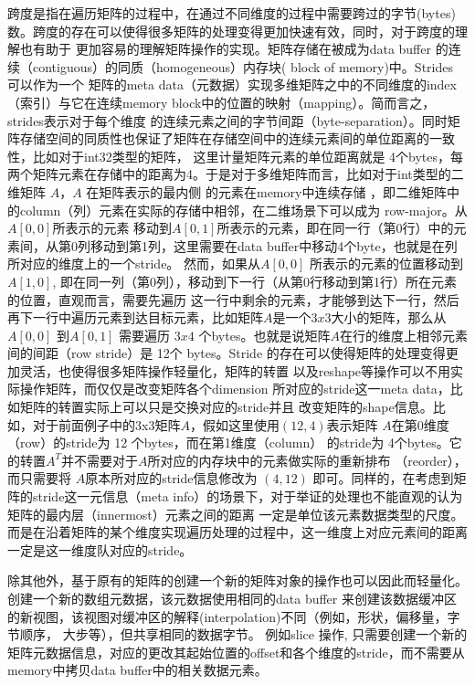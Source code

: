 跨度是指在遍历矩阵的过程中，在通过不同维度的过程中需要跨过的字节(bytes)数。跨度的存在可以使得很多矩阵的处理变得更加快速有效，同时，对于跨度的理解也有助于
更加容易的理解矩阵操作的实现。矩阵存储在被成为data buffer 的连续（contiguous）的同质（homogeneous）内存块( block of memory)中。Strides 可以作为一个
矩阵的meta data（元数据）实现多维矩阵之中的不同维度的index（索引）与它在连续memory block中的位置的映射（mapping）。简而言之，strides表示对于每个维度
的连续元素之间的字节间距（byte-separation）。同时矩阵存储空间的同质性也保证了矩阵在存储空间中的连续元素间的单位距离的一致性，比如对于int32类型的矩阵，
这里计量矩阵元素的单位距离就是 4个bytes，每两个矩阵元素在存储中的距离为4。于是对于多维矩阵而言，比如对于int类型的二维矩阵 $A$，$A$ 在矩阵表示的最内侧
的元素在memory中连续存储 ，即二维矩阵中的column（列）元素在实际的存储中相邻，在二维场景下可以成为 row-major。从$A[0, 0]$所表示的元素
移动到$A[0,1]$所表示的元素，即在同一行（第0行）中的元素间，从第0列移动到第1列，这里需要在data buffer中移动4个byte，也就是在列所对应的维度上的一个stride。
然而，如果从$A[0,0]$ 所表示的元素的位置移动到 $A[1, 0]$, 即在同一列（第0列），移动到下一行（从第0行移动到第1行）所在元素的位置，直观而言，需要先遍历
这一行中剩余的元素，才能够到达下一行，然后再下一行中遍历元素到达目标元素，比如矩阵$A$是一个$3x3$大小的矩阵，那么从 $A[0,0]$ 到$A[0,1]$ 需要遍历
$3x4$ 个bytes。也就是说矩阵$A$在行的维度上相邻元素间的间距（row stride）是 12个 bytes。Stride 的存在可以使得矩阵的处理变得更加灵活，也使得很多矩阵操作轻量化，矩阵的转置
以及reshape等操作可以不用实际操作矩阵，而仅仅是改变矩阵各个dimension 所对应的stride这一meta data，比如矩阵的转置实际上可以只是交换对应的stride并且
改变矩阵的shape信息。比如，对于前面例子中的3x3矩阵$A$，假如这里使用$(12, 4)$表示矩阵 $A$在第0维度（row）的stride为 12 个bytes，而在第1维度（column）
的stride为 4个bytes。它的转置$A^T$并不需要对于$A$所对应的内存块中的元素做实际的重新排布 （reorder），而只需要将 $A$原本所对应的stride信息修改为
$(4, 12)$ 即可。同样的，在考虑到矩阵的stride这一元信息（meta info）的场景下，对于举证的处理也不能直观的认为矩阵的最内层（innermost）元素之间的距离
一定是单位该元素数据类型的尺度。而是在沿着矩阵的某个维度实现遍历处理的过程中，这一维度上对应元素间的距离一定是这一维度队对应的stride。

除其他外，基于原有的矩阵的创建一个新的矩阵对象的操作也可以因此而轻量化。创建一个新的数组元数据，该元数据使用相同的data
buffer 来创建该数据缓冲区的新视图，该视图对缓冲区的解释(interpolation)不同（例如，形状，偏移量，字节顺序， 大步等），但共享相同的数据字节。 例如slice 操作,
只需要创建一个新的矩阵元数据信息，对应的更改其起始位置的offset和各个维度的stride，而不需要从memory中拷贝data buffer中的相关数据元素。

